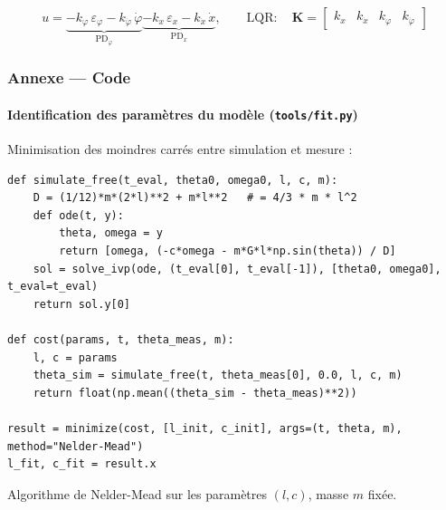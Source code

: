 \begin{frame}
\begin{center}
\end{center}

\vspace{1em}
    \[u = \underbrace{-k_\varphi\,\varepsilon_\varphi - k_{\dot\varphi}\,\dot\varphi}_{\text{PD}_\varphi} \underbrace{- k_x\,\varepsilon_x - k_{\dot x}\,\dot x}_{\text{PD}_x},
\quad\quad
    \text{LQR}: \quad \mathbf{K} = \begin{bmatrix} k_x & k_{\dot x} & k_\varphi & k_{\dot\varphi} \end{bmatrix} \]

\end{frame}


\begin{frame}[fragile]
\frametitle{Annexe — Code}
\framesubtitle{Identification des paramètres du modèle (\texttt{tools/fit.py})}

Minimisation des moindres carrés entre simulation et mesure :

\begin{lstlisting}[style=python]
def simulate_free(t_eval, theta0, omega0, l, c, m):
    D = (1/12)*m*(2*l)**2 + m*l**2   # = 4/3 * m * l^2
    def ode(t, y):
        theta, omega = y
        return [omega, (-c*omega - m*G*l*np.sin(theta)) / D]
    sol = solve_ivp(ode, (t_eval[0], t_eval[-1]), [theta0, omega0], t_eval=t_eval)
    return sol.y[0]

def cost(params, t, theta_meas, m):
    l, c = params
    theta_sim = simulate_free(t, theta_meas[0], 0.0, l, c, m)
    return float(np.mean((theta_sim - theta_meas)**2))

result = minimize(cost, [l_init, c_init], args=(t, theta, m), method="Nelder-Mead")
l_fit, c_fit = result.x
\end{lstlisting}

\vspace{0.1cm}
{\small Algorithme de Nelder-Mead sur les paramètres $(l, c)$, masse $m$ fixée.}

\end{frame}


